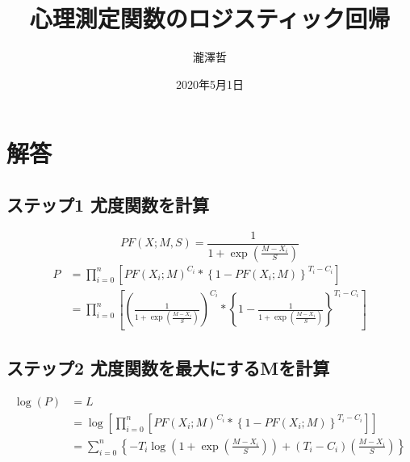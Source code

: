 \documentclass[uplatex, a4paper, 10pt, oneside, twocolumn]{jsarticle}
\title{心理測定関数のロジスティック回帰}
\author{瀧澤哲}
\date{2020年5月1日}
\begin{document}
%

\maketitle

\section*{解答}
  \subsection*{ステップ1 尤度関数を計算}
    \begin{equation}
      PF(X;M,S) = \frac{1}{1 + \exp \left(\frac{M-X_i}{S}\right)}
    \end{equation}
    \begin{equation}
      \begin{split}
        P &= \prod_{i=0}^n \left[ PF(X_i; M)^{C_i} * \left\{1 - PF(X_i; M)\right\}^{T_i - C_i} \right] \\
          &= \prod_{i=0}^n \left[ \left(\frac{1}{1+\exp \left(\frac{M-X_i}{S}\right)}\right)^{C_i} * \left\{1 - \frac{1}{1 + \exp \left(\frac{M-X_i}{S}\right)}\right\}^{T_i - C_i} \right]
      \end{split}
    \end{equation}

  \subsection*{ステップ2 尤度関数を最大にするMを計算}
    \begin{equation}
      \begin{split}
        \log (P) &= L  \\
          &= \log \left[\prod_{i=0}^n \left[ PF(X_i; M)^{C_i} * \left\{1 - PF(X_i; M)\right\}^{T_i - C_i} \right] \right] \\
          &= \sum_{i=0}^n \left\{ -T_i \log \left(1+\exp\left(\frac{M-X_i}{S}\right)\right) + (T_i - C_i) \left(\frac{M-X_i}{S}\right) \right\}
      \end{split}
    \end{equation}
    

\end{document}
